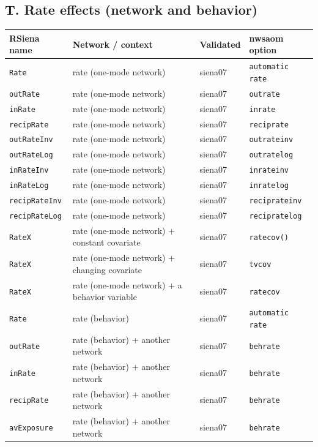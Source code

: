 \subsection*{T. Rate effects (network and behavior)}
\footnotesize
\begin{longtable}{@{}p{2.6cm}p{3.2cm}p{2.9cm}p{5.4cm}@{}}
\toprule
RSiena name & Network / context & Validated & nwsaom option\\
\midrule
\endhead
\texttt{Rate} & rate (one-mode network) & siena07 & \texttt{automatic rate}\\
\texttt{outRate} & rate (one-mode network) & siena07 & \texttt{outrate}\\
\texttt{inRate} & rate (one-mode network) & siena07 & \texttt{inrate}\\
\texttt{recipRate} & rate (one-mode network) & siena07 & \texttt{reciprate}\\
\texttt{outRateInv} & rate (one-mode network) & siena07 & \texttt{outrateinv}\\
\texttt{outRateLog} & rate (one-mode network) & siena07 & \texttt{outratelog}\\
\texttt{inRateInv} & rate (one-mode network) & siena07 & \texttt{inrateinv}\\
\texttt{inRateLog} & rate (one-mode network) & siena07 & \texttt{inratelog}\\
\texttt{recipRateInv} & rate (one-mode network) & siena07 & \texttt{reciprateinv}\\
\texttt{recipRateLog} & rate (one-mode network) & siena07 & \texttt{recipratelog}\\
\texttt{RateX} & rate (one-mode network) + constant covariate & siena07 & \texttt{ratecov()}\\
\texttt{RateX} & rate (one-mode network) + changing covariate & siena07 & \texttt{tvcov}\\
\texttt{RateX} & rate (one-mode network) + a behavior variable & siena07 & \texttt{ratecov}\\
\texttt{Rate} & rate (behavior) & siena07 & \texttt{automatic rate}\\
\texttt{outRate} & rate (behavior) + another network & siena07 & \texttt{behrate}\\
\texttt{inRate} & rate (behavior) + another network & siena07 & \texttt{behrate}\\
\texttt{recipRate} & rate (behavior) + another network & siena07 & \texttt{behrate}\\
\texttt{avExposure} & rate (behavior) + another network & siena07 & \texttt{behrate}\\

\end{longtable}
